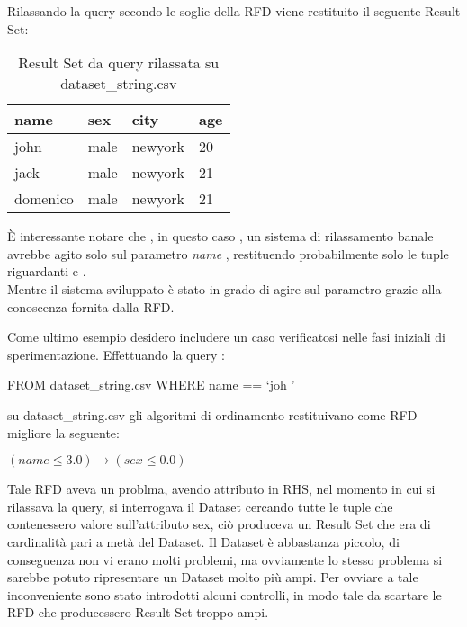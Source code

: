 Rilassando la query secondo le soglie della RFD viene restituito il seguente Result Set:
\begin{table}[H]
    \centering
    \begin{tabular}{|l |l |l |l |}
    \hline
    name & sex & city & age \\
    \hline
    john & male & newyork &  20 \\
    jack & male & newyork &  21 \\
    domenico & male & newyork &  21\\
    \hline
    \end{tabular}
    \caption{Result Set da query rilassata su dataset{\_}string.csv }
    \label{tab:ds_rx_query_ds_str}
\end{table}

È interessante notare che , in questo caso , un sistema di rilassamento banale avrebbe agito solo sul parametro \textit{name} , restituendo probabilmente solo le tuple riguardanti  e . \\
Mentre il sistema sviluppato è stato in grado di agire sul parametro  grazie alla conoscenza fornita dalla RFD.

Come ultimo esempio desidero includere un caso verificatosi nelle fasi iniziali di sperimentazione. Effettuando la query :
\begin{center}
FROM dataset{\_}string.csv WHERE name == \lq joh \rq
\end{center}
su dataset{\_}string.csv gli algoritmi di ordinamento restituivano come RFD migliore la seguente:
\begin{center}
    $(name \leq 3.0)  \rightarrow (sex \leq 0.0)$
\end{center}

Tale RFD aveva un problma, avendo attributo  in RHS, nel momento in cui si rilassava la query, si interrogava il Dataset cercando tutte le tuple che contenessero valore  sull'attributo sex, ciò produceva un Result Set che era di cardinalità pari a metà del Dataset. Il Dataset è abbastanza piccolo, di conseguenza non vi erano molti problemi, ma ovviamente lo stesso problema si sarebbe potuto ripresentare un Dataset molto più ampi. Per ovviare a tale inconveniente sono stato introdotti alcuni controlli, in modo tale da scartare le RFD che producessero Result Set troppo ampi.



